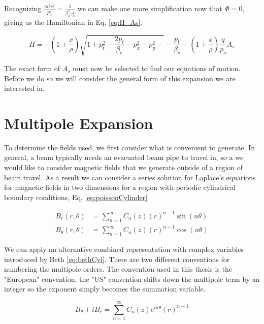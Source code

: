 Recognizing $\frac{m^2c^2}{p_o^2} = \frac{1}{\beta_o^2 \gamma_o^2}$ we can make one more simplification now that $\Phi = 0$, giving us the Hamiltonian in Eq. \ref{eq:H_As}.

\begin{equation} \label{eq:H_As}
	H = -\left(1 + \frac{x}{\rho}\right)\sqrt{1 + p_t^2 - \frac{2 p_t}{\beta_o} - p_x^2 - p_y^2- } - \frac{p_t}{\beta_o} - \left(1 + \frac{x}{\rho}\right)\frac{q}{p_o}A_s
\end{equation}

The exact form of $A_s$ must now be selected to find our equations of motion. Before we do so we will consider the general form of this expansion we are interested in.

\section{Multipole Expansion} \label{sec:multipole}

To determine the fields used, we first consider what is convenient to generate. In general, a beam typically needs an evacuated beam pipe to travel in, so a we would like to consider magnetic fields that we generate outside of a region of beam travel. As a result we can consider a series solution for Laplace's equations for magnetic fields in two dimensions for a region with periodic cylindrical boundary conditions, Eq. \ref{eq:poissonCylinder}

\begin{equation} \label{eq:poissonCylinder}
\begin{split}
	B_r(r,\theta) &= \sum_{n=1}^{\infty} C_n(z) \left( r \right)^{n-1} \sin{(n\theta)}\\
	B_\theta(r,\theta) &= \sum_{n=1}^{\infty} C_n(z) \left( r \right)^{n-1} \cos{(n\theta)}
\end{split}
\end{equation}

We can apply an alternative combined representation with complex variables introduced by Beth \cite{Beth} \ref{eq:bethCyl}. There are two different conventions for numbering the multipole orders. The convention used in this thesis is the "European" convention, the "US" convention shifts down the multipole term by an integer so the exponent simply becomes the summation variable.

\begin{equation} \label{eq:bethCyl}
	B_{\theta} + i B_r = \sum_{n=1}^{\infty} C_n(z) e^{in\theta} \left( r \right)^{n-1}
\end{equation}

